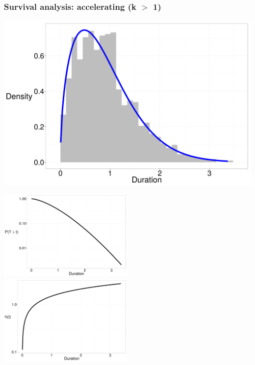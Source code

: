 \documentclass{beamer}
\begin{document}
\begin{frame}
  \frametitle{Survival analysis: accelerating (k \(>\) 1)}

  \begin{center}
    \includegraphics[height = 0.4\textheight, width = \textwidth, keepaspectratio = true]{figure/dur_acc}

    \includegraphics[height = 0.6\textheight, width = 0.5\textwidth, keepaspectratio = true]{figure/sur_acc}
    \includegraphics[height = 0.6\textheight, width = 0.5\textwidth, keepaspectratio = true]{figure/haz_acc}
  \end{center}
\end{frame}

\begin{frame}
  
\end{frame}
\end{document}
